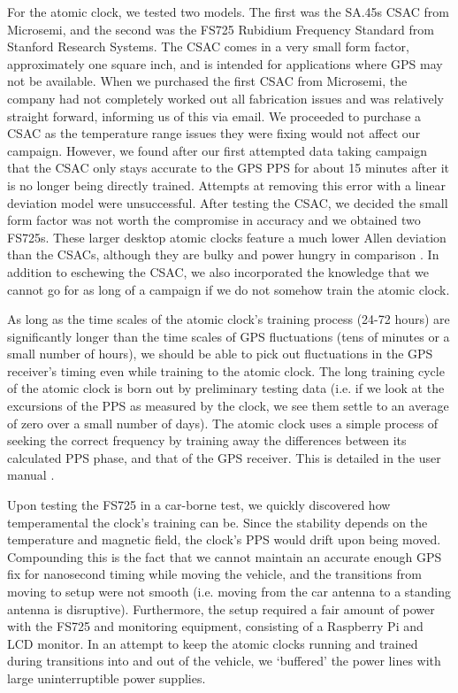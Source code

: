 For the atomic clock, we tested two models. The first was the SA.45s CSAC from Microsemi, and the second was the FS725 Rubidium Frequency Standard from Stanford Research Systems. The CSAC comes in a very small form factor, approximately one square inch, and is intended for applications where GPS may not be available. When we purchased the first CSAC from Microsemi, the company had not completely worked out all fabrication issues and was relatively straight forward, informing us of this via email. We proceeded to purchase a CSAC as the temperature range issues they were fixing would not affect our campaign. However, we found after our first attempted data taking campaign that the CSAC only stays accurate to the GPS PPS for about 15 minutes after it is no longer being directly trained. Attempts at removing this error with a linear deviation model were unsuccessful. 
After testing the CSAC, we decided the small form factor was not worth the compromise in accuracy and we obtained two FS725s. These larger desktop atomic clocks feature a much lower Allen deviation than the CSACs, although they are bulky and power hungry in comparison \cite{fs725spec}. In addition to eschewing the CSAC, we also incorporated the knowledge that we cannot go for as long of a campaign if we do not somehow train the atomic clock. 

As long as the time scales of the atomic clock's training process (24-72 hours) are significantly longer than the time scales of GPS fluctuations (tens of minutes or a small number of hours), we should be able to pick out fluctuations in the GPS receiver's timing even while training to the atomic clock. The long training cycle of the atomic clock is born out by preliminary testing data (i.e. if we look at the excursions of the PPS as measured by the clock, we see them settle to an average of zero over a small number of days). The atomic clock uses a simple process of seeking the correct frequency by training away the differences between its calculated PPS phase, and that of the GPS receiver. This is detailed in the user manual \cite{fs725man}.

Upon testing the FS725 in a car-borne test, we quickly discovered how temperamental the clock's training can be. Since the stability depends on the temperature and magnetic field, the clock's PPS would drift upon being moved. Compounding this is the fact that we cannot maintain an accurate enough GPS fix for nanosecond timing while moving the vehicle, and the transitions from moving to setup were not smooth (i.e. moving from the car antenna to a standing antenna is disruptive). Furthermore, the setup required a fair amount of power with the FS725 and monitoring equipment, consisting of a Raspberry Pi and LCD monitor. In an attempt to keep the atomic clocks running and trained during transitions into and out of the vehicle, we `buffered' the power lines with large uninterruptible power supplies. 

